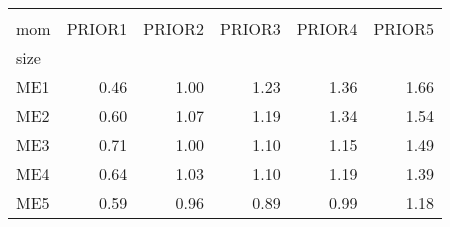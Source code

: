\begin{tabular}{lrrrrr}
\toprule
{} \\
mom & PRIOR1 & PRIOR2 & PRIOR3 & PRIOR4 & PRIOR5 \\
size &        &        &        &        &        \\
\midrule
ME1  &   0.46 &   1.00 &   1.23 &   1.36 &   1.66 \\
ME2  &   0.60 &   1.07 &   1.19 &   1.34 &   1.54 \\
ME3  &   0.71 &   1.00 &   1.10 &   1.15 &   1.49 \\
ME4  &   0.64 &   1.03 &   1.10 &   1.19 &   1.39 \\
ME5  &   0.59 &   0.96 &   0.89 &   0.99 &   1.18 \\
\bottomrule
\end{tabular}
